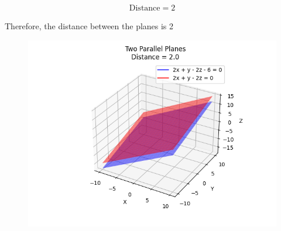 \documentclass[journal]{IEEEtran}
\begin{document}
\begin{align}
\text{Distance} = 2
\end{align}

Therefore, the distance between the planes is 2
\begin{figure}[h!]
    \centering
    \includegraphics[height=0.5\textheight, keepaspectratio]{figs/Figure_1.png}
    \label{figure_1}
\end{figure}
\end{document}
